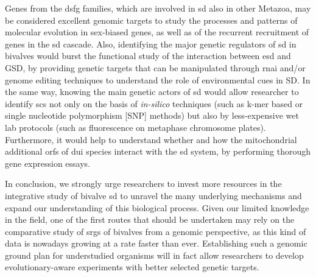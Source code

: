 Genes from the \gls{dsfg} families, which are involved in \gls{sd} also in other Metazoa, may be considered excellent genomic targets to study the processes and patterns of molecular evolution in sex-biased genes, as well as of the recurrent recruitment of genes in the \gls{sd} cascade. Also, identifying the major genetic regulators of \gls{sd} in bivalves would burst the functional study of the interaction between \gls{esd} and GSD, by providing genetic targets that can be manipulated through \gls{rnai} and/or genome editing techniques to understand the role of environmental cues in SD. In the same way, knowing the main genetic actors of \gls{sd} would allow researcher to identify \glspl{sc} not only on the basis of \textit{in-silico} techniques (such as k-mer based or single nucleotide polymorphism [SNP] methods) but also by less-expensive wet lab protocols (such as fluorescence  on metaphase chromosome plates). Furthermore, it would help to understand whether and how the mitochondrial additional \glspl{orf} of \gls{dui} species interact with the \gls{sd} system, by performing thorough gene expression essays.

In conclusion, we strongly urge researchers to invest more resources in the integrative study of bivalve \gls{sd} to unravel the many underlying mechanisms and expand our understanding of this biological process. Given our limited knowledge in the field, one of the first routes that should be undertaken may rely on the comparative study of \glspl{srg} of bivalves from a genomic perspective, as this kind of data is nowadays growing at a rate faster than ever. Establishing such a genomic ground plan for understudied organisms will in fact allow researchers to develop evolutionary-aware experiments with better selected genetic targets.


